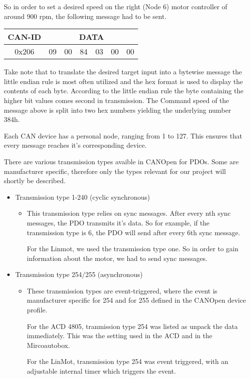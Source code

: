 So in order to set a desired speed on the right (Node 6) motor controller of around 900 rpm, the following message had to be sent.

\begin{tabular}{|c|c|c|c|c|c|c|}
	\hline 
	CAN-ID & \multicolumn{6}{c|}{DATA} \\ 
	\hline 
	0x206 & 09 & 00 & 84 & 03 & 00 & 00 \\ 
	\hline 
\end{tabular} 

Take note that to translate the desired target input into a bytewise message
the little endian rule is most often utilized and the hex format is used to display the contents of each byte. According to the little endian rule the byte containing the higher bit values comes second in transmission. 
The Command speed of the message above is split into two hex numbers yielding the underlying number 384h.

Each CAN device has a personal node, ranging from 1 to 127. This ensures that every message reaches it's corresponding device.


There are various transmission types avaible in CANOpen for PDOs. Some are manufacturer specific, therefore only the types relevant for our project will shortly be described.

\begin{itemize}

\item Transmission type 1-240 (cyclic synchronous)
\begin{itemize}
	\item This transmission type relies on sync messages. After every nth sync messages, the PDO transmits it's data. So for example, if the transmission type is 6, the PDO will send after every 6th sync message.
	
	For the Linmot, we used the transmission type one. So in order to gain information about the motor, we had to send sync messages.
	
\end{itemize}

\item {Transmission type 254/255 (asynchronous)}
\begin{itemize}
	\item These transmission types are event-triggered, where the event is manufacturer specific for 254 and for 255 defined in the CANOpen device profile.
	
	For the ACD 4805, tranmission type 254 was listed as unpack the data immediately. This was the setting used in the ACD and in the Mircoautobox.
	
	For the LinMot, transmission type 254 was event triggered, with an adjustable internal timer which triggers the event.
\end{itemize}

\end{itemize}


